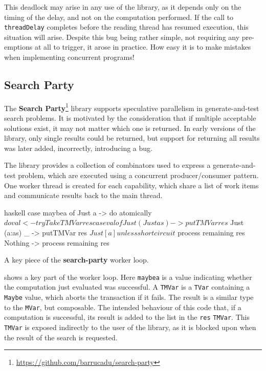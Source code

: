 This deadlock may arise in any use of the library, as it depends only
on the timing of the delay, and not on the computation performed.  If
the call to \verb|threadDelay| completes before the reading thread has
resumed execution, this situation will arise.  Despite this bug being
rather simple, not requiring any pre-emptions at all to trigger, it
arose in practice.  How easy it is to make mistakes when implementing
concurrent programs!

\subsection{Search Party}

The \textbf{Search Party}\footnote{\url{https://github.com/barrucadu/search-party}}
library supports speculative parallelism in generate-and-test search
problems.  It is motivated by the consideration that if multiple
acceptable solutions exist, it may not matter which one is returned.
In early versions of the library, only single results could be
returned, but support for returning all results was later added,
incorrectly, introducing a bug.

The library provides a collection of combinators used to express a
generate-and-test problem, which are executed using a concurrent
producer/consumer pattern.  One worker thread is created for each
capability, which share a list of work items and communicate results
back to the main thread.

\begin{listing}
\centering
\begin{cminted}{haskell}
case maybea of
  Just a -> do
    atomically $ do
      val <- tryTakeTMVar res
      case val of
        Just (Just as) -> putTMVar res $ Just (a:as)
        _ -> putTMVar res $ Just [a]
    unless shortcircuit $
      process remaining res
  Nothing -> process remaining res
\end{cminted}
\caption{A key piece of the \textbf{search-party} worker loop.}\label{lst:example-searchparty1}
\end{listing}

 shows a key part of the worker loop.
Here \verb|maybea| is a value indicating whether the computation just
evaluated was successful.  A \verb|TMVar| is a \verb|TVar| containing
a \verb|Maybe| value, which aborts the transaction if it fails.  The
result is a similar type to the \verb|MVar|, but composable.  The
intended behaviour of this code that, if a computation is successful,
its result is added to the list in the \verb|res| \verb|TMVar|.  This
\verb|TMVar| is exposed indirectly to the user of the library, as it
is blocked upon when the result of the search is requested.

